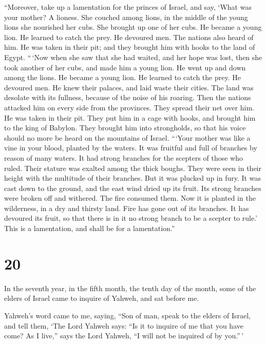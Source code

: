  ``Moreover, take up a lamentation for the princes of
Israel,  and say, `What was your mother? A lioness. She
couched among lions, in the middle of the young lions she nourished her
cubs.  She brought up one of her cubs. He became a young
lion. He learned to catch the prey. He devoured men.  The
nations also heard of him. He was taken in their pit; and they brought
him with hooks to the land of Egypt.  ``\,`Now when she saw
that she had waited, and her hope was lost, then she took another of her
cubs, and made him a young lion.  He went up and down among
the lions. He became a young lion. He learned to catch the prey. He
devoured men.  He knew their palaces, and laid waste their
cities. The land was desolate with its fullness, because of the noise of
his roaring.  Then the nations attacked him on every side
from the provinces. They spread their net over him. He was taken in
their pit.  They put him in a cage with hooks, and brought
him to the king of Babylon. They brought him into strongholds, so that
his voice should no more be heard on the mountains of Israel.
 ```Your mother was like a vine in your blood, planted by
the waters. It was fruitful and full of branches by reason of many
waters.  It had strong branches for the scepters of those
who ruled. Their stature was exalted among the thick boughs. They were
seen in their height with the multitude of their branches. 
But it was plucked up in fury. It was cast down to the ground, and the
east wind dried up its fruit. Its strong branches were broken off and
withered. The fire consumed them.  Now it is planted in the
wilderness, in a dry and thirsty land.  Fire has gone out
of its branches. It has devoured its fruit, so that there is in it no
strong branch to be a scepter to rule.' This is a lamentation, and shall
be for a lamentation.''

\hypertarget{section-18}{%
\section{20}\label{section-18}}

 In the seventh year, in the fifth month, the tenth day of
the month, some of the elders of Israel came to inquire of Yahweh, and
sat before me.

 Yahweh's word came to me, saying,  ``Son of
man, speak to the elders of Israel, and tell them, `The Lord Yahweh
says: ``Is it to inquire of me that you have come? As I live,'' says the
Lord Yahweh, ``I will not be inquired of by you.''\,'

